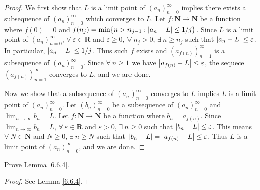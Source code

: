 \begin{proof}
We first show that \(L\) is a limit point of \((a_n)_{n = 0}^\infty\) implies there exists a subsequence of \((a_n)_{n = 0}^\infty\) which converges to \(L\).
Let \(f : \mathbf{N} \to \mathbf{N}\) be a function where \(f(0) = 0\) and \(f(n_j) = \min\{n > n_{j - 1} : \abs*{a_n - L} \leq 1 / j\}\).
Since \(L\) is a limit point of \((a_n)_{n = 0}^\infty\), \(\forall\ \varepsilon \in \mathbf{R}\) and \(\varepsilon \geq 0\), \(\forall\ n_j > 0\), \(\exists\ n \geq n_j\) such that \(\abs*{a_n - L} \leq \varepsilon\).
In particular, \(\abs*{a_n - L} \leq 1 / j\).
Thus such \(f\) exists and \((a_{f(n)})_{n = 1}^\infty\) is a subsequence of \((a_n)_{n = 0}^\infty\).
Since \(\forall\ n \geq 1\) we have \(\abs*{a_{f(n)} - L} \leq \varepsilon\), the sequece \((a_{f(n)})_{n = 1}^\infty\) converges to \(L\), and we are done.

Now we show that a subsequence of \((a_n)_{n = 0}^\infty\) converges to \(L\) implies \(L\) is a limit point of \((a_n)_{n = 0}^\infty\).
Let \((b_n)_{n = 0}^\infty\) be a subsequence of \((a_n)_{n = 0}^\infty\) and \(\lim_{n \to \infty} b_n = L\).
Let \(f : \mathbf{N} \to \mathbf{N}\) be a function where \(b_n = a_{f(n)}\).
Since \(\lim_{n \to \infty} b_n = L\), \(\forall\ \varepsilon \in \mathbf{R}\) and \(\varepsilon > 0\), \(\exists\ n \geq 0\) such that \(\abs*{b_n - L} \leq \varepsilon\).
This means \(\forall\ N \in \mathbf{N}\) and \(N \geq 0\), \(\exists\ n \geq N\) such that \(\abs*{b_n - L} = \abs*{a_{f(n)} - L} \leq \varepsilon\).
Thus \(L\) is a limit point of \((a_n)_{n = 0}^\infty\), and we are done.
\end{proof}

\exercisesection

\begin{exercise}\label{ex 6.6.1}
Prove Lemma \ref{6.6.4}.
\end{exercise}

\begin{proof}
See Lemma \ref{6.6.4}.
\end{proof}